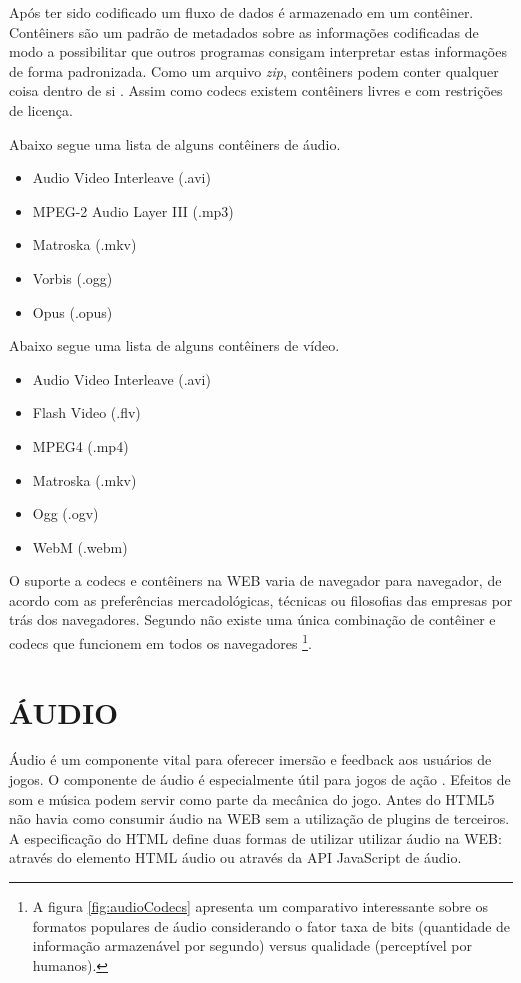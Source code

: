 Após ter sido codificado um fluxo de dados é armazenado em um
contêiner. Contêiners são um padrão de metadados sobre as
informações codificadas de modo a possibilitar que outros programas
consigam interpretar estas informações de forma padronizada. Como
um arquivo \textit{zip}, contêiners podem conter qualquer coisa dentro de si
\autocite{diveIntohtml}. Assim como codecs existem contêiners livres e
com restrições de licença.

Abaixo segue uma lista de alguns contêiners de áudio.
\begin{itemize}
    \item Audio Video Interleave (.avi)
    \item MPEG-2 Audio Layer III (.mp3)
    \item Matroska (.mkv)
    \item Vorbis (.ogg)
    \item Opus (.opus)
\end{itemize}

Abaixo segue uma lista de alguns contêiners de vídeo.
\begin{itemize}
    \item Audio Video Interleave (.avi)
    \item Flash Video (.flv)
    \item MPEG4 (.mp4)
    \item Matroska (.mkv)
    \item Ogg (.ogv)
    \item WebM (.webm)
\end{itemize}

O suporte a codecs e contêiners na WEB varia de navegador para
navegador, de acordo com as preferências mercadológicas, técnicas
ou filosofias das empresas por trás dos navegadores. Segundo
\cite{diveIntohtml} não existe uma única combinação de contêiner e
codecs que funcionem em todos os navegadores
\footnote{A figura \ref{fig:audioCodecs} apresenta um comparativo interessante
sobre os formatos populares de áudio considerando o fator taxa de bits
(quantidade de informação armazenável por segundo) versus qualidade
(perceptível por humanos).}.

\section{ÁUDIO}

Áudio é um componente vital para oferecer imersão e feedback aos
usuários de jogos. O componente de áudio é especialmente útil para
jogos de ação \autocite{browserGamesTechnologyAndFuture}. Efeitos
de som e música podem servir como parte da mecânica do jogo. Antes
do HTML5 não havia como consumir áudio na WEB sem a utilização de
plugins de terceiros. A especificação do HTML define duas formas de
utilizar utilizar áudio na WEB: através do elemento HTML áudio ou
através da API JavaScript de áudio.

